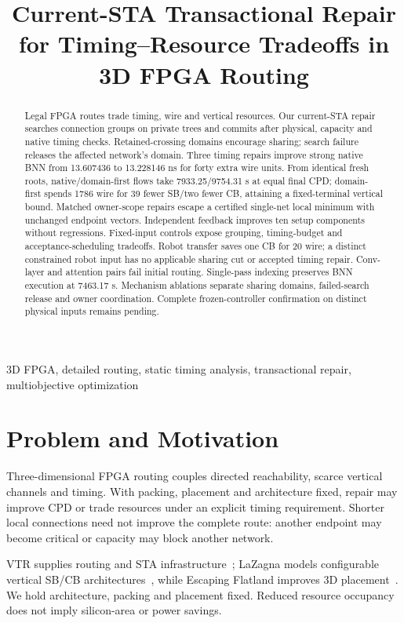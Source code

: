 \documentclass[conference,10pt]{IEEEtran}
\title{Current-STA Transactional Repair for Timing--Resource Tradeoffs in 3D FPGA Routing}
\author{\IEEEauthorblockN{Anonymous development manuscript}}
\begin{document}
\maketitle
\begin{abstract}
Legal FPGA routes trade timing, wire and vertical resources. Our current-STA repair searches connection groups on private trees and commits after physical, capacity and native timing checks. Retained-crossing domains encourage sharing; search failure releases the affected network's domain. Three timing repairs improve strong native BNN from 13.607436 to 13.228146 ns for forty extra wire units. From identical fresh roots, native/domain-first flows take 7933.25/9754.31 s at equal final CPD; domain-first spends 1786 wire for 39 fewer SB/two fewer CB, attaining a fixed-terminal vertical bound. Matched owner-scope repairs escape a certified single-net local minimum with unchanged endpoint vectors. Independent feedback improves ten setup components without regressions. Fixed-input controls expose grouping, timing-budget and acceptance-scheduling tradeoffs. Robot transfer saves one CB for 20 wire; a distinct constrained robot input has no applicable sharing cut or accepted timing repair. Conv-layer and attention pairs fail initial routing. Single-pass indexing preserves BNN execution at 7463.17 s. Mechanism ablations separate sharing domains, failed-search release and owner coordination. Complete frozen-controller confirmation on distinct physical inputs remains pending.
\end{abstract}
\begin{IEEEkeywords}
3D FPGA, detailed routing, static timing analysis, transactional repair, multiobjective optimization
\end{IEEEkeywords}

\section{Problem and Motivation}
Three-dimensional FPGA routing couples directed reachability, scarce vertical channels and timing. With packing, placement and architecture fixed, repair may improve CPD or trade resources under an explicit timing requirement. Shorter local connections need not improve the complete route: another endpoint may become critical or capacity may block another network.

VTR supplies routing and STA infrastructure~\cite{vtr9paper}; LaZagna models configurable vertical SB/CB architectures~\cite{lazagna}, while Escaping Flatland improves 3D placement~\cite{flatland}. We hold architecture, packing and placement fixed. Reduced resource occupancy does not imply silicon-area or power savings.
\end{document}
